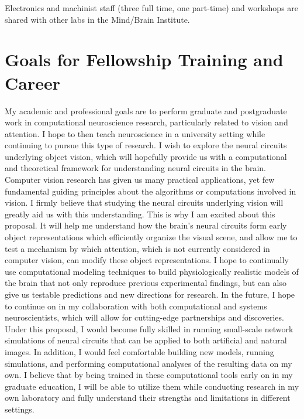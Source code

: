 \documentclass[11pt,notitlepage]{article}
\begin{document}
Electronics and machinist staff (three full time, one part-time) and workshops are shared with other labs in the Mind/Brain Institute.

\clearpage

\section*{Goals for Fellowship Training and Career}
My academic and professional goals are to perform graduate and postgraduate work in computational neuroscience research, particularly related to vision and attention. I hope to then teach neuroscience in a university setting while continuing to pursue this type of research. I wish to explore the neural circuits underlying object vision, which will hopefully provide us with a computational and theoretical framework for understanding neural circuits in the brain. Computer vision research has given us many practical applications, yet few fundamental guiding principles about the algorithms or computations involved in vision. I firmly believe that studying the neural circuits underlying vision will greatly aid us with this understanding. This is why I am excited about this proposal. It will help me understand how the brain's neural circuits form early object representations which efficiently organize the visual scene, and allow me to test a mechanism by which attention, which is not currently considered in computer vision, can modify these object representations. I hope to continually use computational modeling techniques to build physiologically realistic models of the brain that not only reproduce previous experimental findings, but can also give us testable predictions and new directions for research. In the future, I hope to continue on in my collaboration with both computational and systems neuroscientists, which will allow for cutting-edge partnerships and discoveries. Under this proposal, I would become fully skilled in running small-scale network simulations of neural circuits that can be applied to both artificial and natural images. In addition, I would feel comfortable building new models, running simulations, and performing computational analyses of the resulting data on my own.
I believe that by being trained in these computational tools early on in my graduate education, I will be able to utilize them while conducting research in my own laboratory and fully understand their strengths and limitations in different settings.
\end{document}
